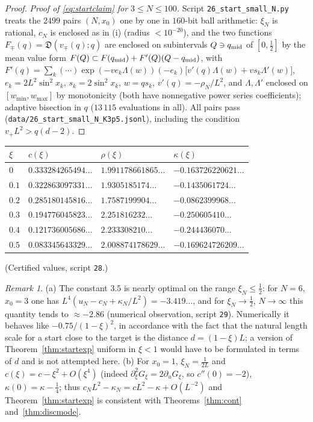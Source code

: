 \documentclass[11pt,a4paper]{article}
\theoremstyle{definition}
\theoremstyle{remark}
\newtheorem{remark}[theorem]{Remark}
\newcommand{\fD}{\mathfrak{D}}
\begin{document}
\begin{proof}
\emph{Proof of \eqref{eq:startclaim} for $3\le N\le100$.} Script \texttt{26\_start\_small\_N.py} treats the $2499$ pairs
$(N,x_0)$ one by one in $160$-bit ball arithmetic: $\xi_N$ is rational, $c_N$ is enclosed as in (i) (radius $<10^{-20}$),
and the two functions $F_\mp(q)=\fD(v_\mp(q);q)$ are enclosed on subintervals $Q\ni q_{\rm mid}$ of $[0,\frac12]$ by the mean
value form $F(Q)\subset F(q_{\rm mid})+F'(Q)(Q-q_{\rm mid})$, with
$F'(q)=\sum_k(\cdots)\exp(-ve_k\Lambda(w))(-e_k)\bigl[v'(q)\Lambda(w)+vs_k\Lambda'(w)\bigr]$, $e_k=2L^2\sin^2x_k$,
$s_k=2\sin^2x_k$, $w=qs_k$, $v'(q)=-\rho_N/L^2$, and $\Lambda,\Lambda'$ enclosed on $[w_{\min},w_{\max}]$ by monotonicity
(both have nonnegative power series coefficients); adaptive bisection in $q$ ($13\,115$ evaluations in all). All pairs
pass (\texttt{data/26\_start\_small\_N\_K3p5.jsonl}), including the condition $v_+L^2>q(d-2)$.
\end{proof}

\begin{center}\small
\begin{tabular}{llll}
\toprule
$\xi$ & $c(\xi)$ & $\rho(\xi)$ & $\kappa(\xi)$\\
\midrule
$0$ & $0.333284265494\ldots$ & $1.991178661865\ldots$ & $-0.163726220621\ldots$\\
$0.1$ & $0.322863097331\ldots$ & $1.9305185174\ldots$ & $-0.1435061724\ldots$\\
$0.2$ & $0.285180145816\ldots$ & $1.7587199904\ldots$ & $-0.0862399968\ldots$\\
$0.3$ & $0.194776045823\ldots$ & $2.251816232\ldots$ & $-0.250605410\ldots$\\
$0.4$ & $0.121736005686\ldots$ & $2.233308210\ldots$ & $-0.244436070\ldots$\\
$0.5$ & $0.083345643329\ldots$ & $2.008874178629\ldots$ & $-0.169624726209\ldots$\\
\bottomrule
\end{tabular}
\end{center}
(Certified values, script \texttt{28}.)

\begin{remark}\label{rem:startK}
(a) The constant $3.5$ is nearly optimal on the range $\xi_N\le\frac12$: for $N=6$, $x_0=3$ one has
$L^4(u_N-c_N+\kappa_N/L^2)=-3.419\ldots$, and for $\xi_N\to\frac12$, $N\to\infty$ this quantity tends to $\approx-2.86$
(numerical observation, script \texttt{29}). Numerically it behaves like $-0.75/(1-\xi)^2$, in accordance with the fact that
the natural length scale for a start close to the target is the distance $d=(1-\xi)L$; a version of
Theorem~\ref{thm:startexp} uniform in $\xi<1$ would have to be formulated in terms of $d$ and is not attempted here.
(b) For $x_0=1$, $\xi_N=\frac1{2L}$ and $c(\xi)=c-\xi^2+O(\xi^4)$ (indeed $\partial_\xi^2G_\xi=2\partial_uG_\xi$, so
$c''(0)=-2$), $\kappa(0)=\kappa-\frac14$; thus $c_NL^2-\kappa_N=cL^2-\kappa+O(L^{-2})$ and Theorem~\ref{thm:startexp} is
consistent with Theorems~\ref{thm:cont} and~\ref{thm:discmode}.
\end{remark}
\end{document}
